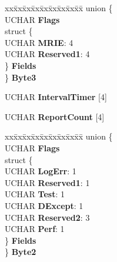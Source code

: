 \begin{DoxyCompactItemize}
\begin{tabbing}
\end{tabbing}\item 
\mbox{\label{struct___m_o_d_e___f_a_i_l___r_e_p_o_r_t___p_a_g_e_aba9d75d0b3212ae79fe8d8397b80006c}} 
\begin{tabbing}
xx\=xx\=xx\=xx\=xx\=xx\=xx\=xx\=xx\=\kill
union \{\\
\>UCHAR {\bfseries Flags}\\
\>struct \{\\
\>\>UCHAR {\bfseries MRIE}: 4\\
\>\>UCHAR {\bfseries Reserved1}: 4\\
\>\} {\bfseries Fields}\\
\} {\bfseries Byte3}\\

\end{tabbing}\item 
\mbox{\label{struct___m_o_d_e___f_a_i_l___r_e_p_o_r_t___p_a_g_e_aa573cd536fe347c894439aa3b13c3b50}} 
U\+C\+H\+AR {\bfseries Interval\+Timer} \mbox{[}4\mbox{]}
\item 
\mbox{\label{struct___m_o_d_e___f_a_i_l___r_e_p_o_r_t___p_a_g_e_a88705c2d7c8b28b955984fa03ca9f298}} 
U\+C\+H\+AR {\bfseries Report\+Count} \mbox{[}4\mbox{]}
\item 
\mbox{\label{struct___m_o_d_e___f_a_i_l___r_e_p_o_r_t___p_a_g_e_a24cccb777ba6f7342d0d8fe612776d4c}} 
\begin{tabbing}
xx\=xx\=xx\=xx\=xx\=xx\=xx\=xx\=xx\=\kill
union \{\\
\>UCHAR {\bfseries Flags}\\
\>struct \{\\
\>\>UCHAR {\bfseries LogErr}: 1\\
\>\>UCHAR {\bfseries Reserved1}: 1\\
\>\>UCHAR {\bfseries Test}: 1\\
\>\>UCHAR {\bfseries DExcept}: 1\\
\>\>UCHAR {\bfseries Reserved2}: 3\\
\>\>UCHAR {\bfseries Perf}: 1\\
\>\} {\bfseries Fields}\\
\} {\bfseries Byte2}\\


\end{tabbing}
\end{DoxyCompactItemize}

